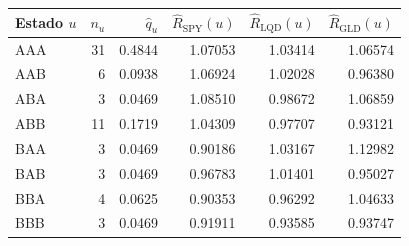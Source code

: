{\small
\begin{tabular}{lrrrrr}
\toprule
Estado $u$ & $n_u$ & $\hat q_u$ & $\hat R_{\mathrm{SPY}}(u)$ & $\hat R_{\mathrm{LQD}}(u)$ & $\hat R_{\mathrm{GLD}}(u)$ \\
\midrule
AAA & 31 & 0.4844 & 1.07053 & 1.03414 & 1.06574 \\
AAB & 6 & 0.0938 & 1.06924 & 1.02028 & 0.96380 \\
ABA & 3 & 0.0469 & 1.08510 & 0.98672 & 1.06859 \\
ABB & 11 & 0.1719 & 1.04309 & 0.97707 & 0.93121 \\
BAA & 3 & 0.0469 & 0.90186 & 1.03167 & 1.12982 \\
BAB & 3 & 0.0469 & 0.96783 & 1.01401 & 0.95027 \\
BBA & 4 & 0.0625 & 0.90353 & 0.96292 & 1.04633 \\
BBB & 3 & 0.0469 & 0.91911 & 0.93585 & 0.93747 \\
\bottomrule
\end{tabular}
}
